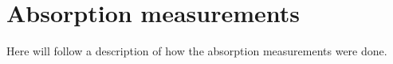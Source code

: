 
\section{Absorption measurements}
Here will follow a description of how the absorption measurements were done. 